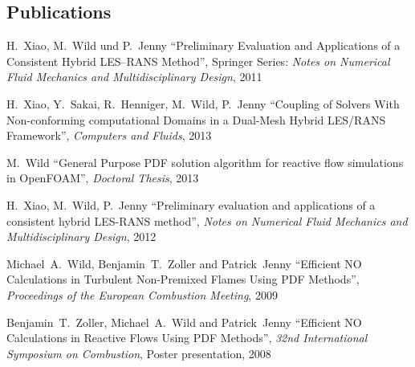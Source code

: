 \documentclass[line,11pt,a4paper]{resume}
\begin{document}
\begin{resume}
\pagebreak
\section{\mysidestyle Publications}\vspace{2mm}
H.~Xiao, M.~Wild und P.~Jenny ``Preliminary Evaluation and
Applications of a Consistent Hybrid LES--RANS Method'', Springer Series:
\textsl{Notes on Numerical Fluid Mechanics and Multidisciplinary Design}, 2011

\vspace{-2mm}
H.~Xiao, Y.~Sakai, R.~Henniger, M.~Wild, P.~Jenny
``Coupling of Solvers With Non-conforming computational Domains in a Dual-Mesh
Hybrid LES/RANS Framework'', \textsl{Computers and Fluids}, 2013

M.~Wild
``General Purpose PDF solution algorithm for reactive flow simulations in
OpenFOAM'', \textsl{Doctoral Thesis}, 2013

\vspace{-2mm}
H.~Xiao, M.~Wild, P.~Jenny
``Preliminary evaluation and applications of a consistent hybrid LES-RANS
method'', \textsl{Notes on Numerical Fluid Mechanics and Multidisciplinary
Design}, 2012

\vspace{-2mm}
Michael~A.~Wild, Benjamin~T.~Zoller and Patrick~Jenny
``Efficient $\mathrm{NO}$ Calculations in Turbulent Non-Premixed Flames Using
PDF Methods'', \textsl{Proceedings of the European Combustion Meeting}, 2009

\vspace{-2mm}
Benjamin~T.~Zoller, Michael~A.~Wild and Patrick~Jenny
``Efficient $\mathrm{NO}$ Calculations in Reactive Flows Using PDF Methods'',
\textsl{32nd International Symposium on Combustion}, Poster presentation, 2008



\end{resume}
\end{document}
